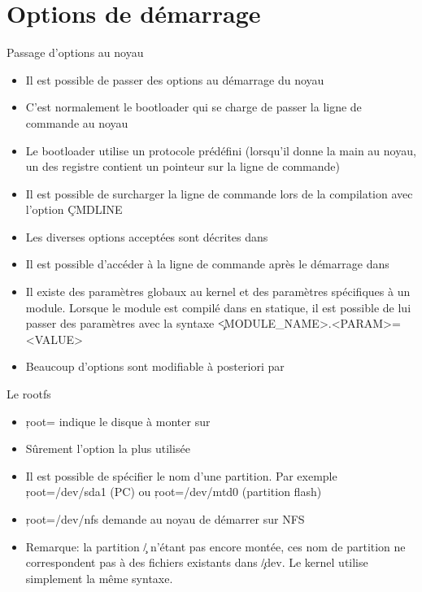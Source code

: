 \section{Options de démarrage}
\begin{frame}[fragile=singleslide]{Passage d'options au noyau}
  \begin{itemize} 
  \item Il est possible de passer des options au démarrage du noyau
  \item C'est  normalement le bootloader  qui se charge de  passer la
    ligne de commande au noyau
  \item Le bootloader utilise  un protocole prédéfini (lorsqu'il donne
    la  main au noyau,  un des  registre contient  un pointeur  sur la
    ligne de commande)
  \item Il est possible de surcharger  la ligne de commande lors de la
    compilation avec l'option \c{CMDLINE}
  \item   Les   diverses   options   acceptées   sont   décrites   dans
  \item  Il est possible  d'accéder à  la ligne  de commande  après le
    démarrage dans 
  \item Il existe  des paramètres globaux au kernel  et des paramètres
    spécifiques à  un module.  Lorsque le module  est compilé  dans en
    statique, il  est possible  de lui passer  des paramètres  avec la
    syntaxe \c{<MODULE_NAME>.<PARAM>=<VALUE>}
  \item Beaucoup d'options sont modifiable à posteriori par 
  \end{itemize} 
\end{frame} 

\begin{frame}[fragile=singleslide]{Le rootfs}
  \begin{itemize}
  \item \c{root=} indique le disque  à monter sur \file{/}
  \item Sûrement l'option la plus utilisée
  \item  Il est  possible de  spécifier  le nom  d'une partition.  Par
    exemple  \c{root=/dev/sda1} (PC) ou  \c{root=/dev/mtd0} (partition
    flash)
  \item \c{root=/dev/nfs} demande au noyau de démarrer sur NFS
  \item Remarque:  la partition \c{/}  n'étant pas encore  montée, ces
    nom  de partition ne  correspondent pas  à des  fichiers existants
    dans \c{/dev}. Le kernel utilise simplement la même syntaxe.
  \end{itemize} 
\end{frame} 

